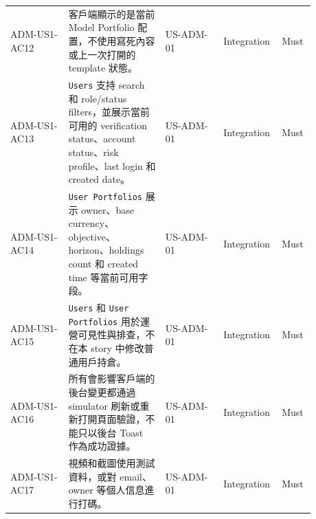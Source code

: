\begin{longtable}{L{0.18\linewidth}L{0.30\linewidth}L{0.18\linewidth}L{0.12\linewidth}L{0.10\linewidth}}
ADM-US1-AC12 & 客戶端顯示的是當前 Model Portfolio 配置，不使用寫死內容或上一次打開的 template 狀態。 & US-ADM-01 & Integration & Must \\
ADM-US1-AC13 & \texttt{Users} 支持 search 和 role/\allowbreak{}status filters，並展示當前可用的 verification status、account status、risk profile、last login 和 created date。 & US-ADM-01 & Integration & Must \\
ADM-US1-AC14 & \texttt{User Portfolios} 展示 owner、base currency、objective、horizon、holdings count 和 created time 等當前可用字段。 & US-ADM-01 & Integration & Must \\
ADM-US1-AC15 & \texttt{Users} 和 \texttt{User Portfolios} 用於運營可見性與排查，不在本 story 中修改普通用戶持倉。 & US-ADM-01 & Integration & Must \\
ADM-US1-AC16 & 所有會影響客戶端的後台變更都通過 simulator 刷新或重新打開頁面驗證，不能只以後台 Toast 作為成功證據。 & US-ADM-01 & Integration & Must \\
ADM-US1-AC17 & 視頻和截圖使用測試資料，或對 email、owner 等個人信息進行打碼。 & US-ADM-01 & Integration & Must \\
\bottomrule
\end{longtable}
\endgroup
